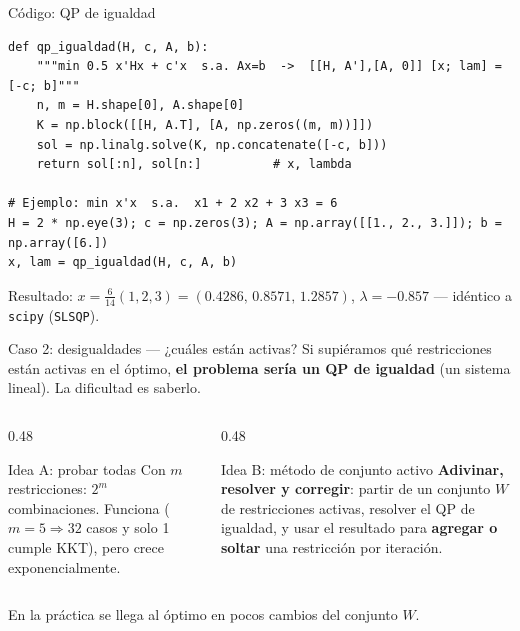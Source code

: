 \documentclass[aspectratio=169]{beamer}
\begin{document}
\begin{frame}[fragile]{Código: QP de igualdad}
\begin{lstlisting}
def qp_igualdad(H, c, A, b):
    """min 0.5 x'Hx + c'x  s.a. Ax=b  ->  [[H, A'],[A, 0]] [x; lam] = [-c; b]"""
    n, m = H.shape[0], A.shape[0]
    K = np.block([[H, A.T], [A, np.zeros((m, m))]])
    sol = np.linalg.solve(K, np.concatenate([-c, b]))
    return sol[:n], sol[n:]          # x, lambda

# Ejemplo: min x'x  s.a.  x1 + 2 x2 + 3 x3 = 6
H = 2 * np.eye(3); c = np.zeros(3); A = np.array([[1., 2., 3.]]); b = np.array([6.])
x, lam = qp_igualdad(H, c, A, b)
\end{lstlisting}
  \small
  Resultado: $x=\tfrac{6}{14}(1,2,3)=(0.4286,\,0.8571,\,1.2857)$, $\lambda=-0.857$ --- idéntico a \texttt{scipy} (\texttt{SLSQP}).
\end{frame}

\begin{frame}{Caso 2: desigualdades --- ¿cuáles están activas?}
  Si supiéramos qué restricciones están activas en el óptimo, \textbf{el problema sería un QP de igualdad} (un sistema lineal). La dificultad es saberlo.
  \begin{columns}[T]
    \begin{column}{0.48\textwidth}
      \begin{block}{Idea A: probar todas}
        Con $m$ restricciones: $2^m$ combinaciones. Funciona ($m=5\Rightarrow32$ casos y solo 1 cumple KKT), pero crece exponencialmente.
      \end{block}
    \end{column}
    \begin{column}{0.48\textwidth}
      \begin{block}{Idea B: método de conjunto activo}
        \textbf{Adivinar, resolver y corregir}: partir de un conjunto $W$ de restricciones activas, resolver el QP de igualdad, y usar el resultado para \textbf{agregar o soltar} una restricción por iteración.
      \end{block}
    \end{column}
  \end{columns}
  \vspace{0.2cm}
  \centering En la práctica se llega al óptimo en pocos cambios del conjunto $W$.
\end{frame}
\end{document}
